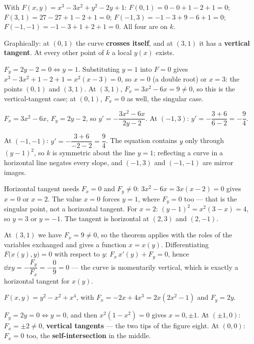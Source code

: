 \begin{solutions}
  \item With $F(x,y)=x^{3}-3x^{2}+y^{2}-2y+1$:
        $F(0,1)=0-0+1-2+1=0$; \;$F(3,1)=27-27+1-2+1=0$;
        \;$F(-1,3)=-1-3+9-6+1=0$; \;$F(-1,-1)=-1-3+1+2+1=0$.
        All four are on $k$.
  \item Graphically: at $(0,1)$ the curve \textbf{crosses itself}, and at
        $(3,1)$ it has a \textbf{vertical tangent}. At every other point of
        $k$ a local $y(x)$ exists.
  \item $F_{y}=2y-2=0\iff y=1$. Substituting $y=1$ into $F=0$ gives
        $x^{3}-3x^{2}+1-2+1=x^{2}(x-3)=0$, so $x=0$ (a double root) or
        $x=3$: the points $(0,1)$ and $(3,1)$. At $(3,1)$,
        $F_{x}=3x^{2}-6x=9\neq0$, so this is the vertical-tangent case; at
        $(0,1)$, $F_{x}=0$ as well, the singular case.
  \item $F_{x}=3x^{2}-6x$, $F_{y}=2y-2$, so
        $y'=-\dfrac{3x^{2}-6x}{2y-2}$. At $(-1,3)$:
        $y'=-\dfrac{3+6}{6-2}=-\dfrac94$.
  \item At $(-1,-1)$: $y'=-\dfrac{3+6}{-2-2}=\dfrac94$. The equation
        contains $y$ only through $(y-1)^{2}$, so $k$ is symmetric about the
        line $y=1$; reflecting a curve in a horizontal line negates every
        slope, and $(-1,3)$ and $(-1,-1)$ are mirror images.
  \item Horizontal tangent needs $F_{x}=0$ and $F_{y}\neq0$:
        $3x^{2}-6x=3x(x-2)=0$ gives $x=0$ or $x=2$. The value $x=0$ forces
        $y=1$, where $F_{y}=0$ too --- that is the singular point, not a
        horizontal tangent. For $x=2$: $(y-1)^{2}=x^{2}(3-x)=4$, so $y=3$ or
        $y=-1$. The tangent is horizontal at $(2,3)$ and $(2,-1)$.
  \item At $(3,1)$ we have $F_{x}=9\neq0$, so the theorem applies with the
        roles of the variables exchanged and gives a function $x=x(y)$.
        Differentiating $F\bigl(x(y),y\bigr)=0$ with respect to $y$:
        $F_{x}\,x'(y)+F_{y}=0$, hence
        $\dd{x}{y}=-\dfrac{F_{y}}{F_{x}}=-\dfrac{0}{9}=0$ --- the curve is
        momentarily vertical, which is exactly a horizontal tangent for
        $x(y)$.
  \item $F(x,y)=y^{2}-x^{2}+x^{4}$, with $F_{x}=-2x+4x^{3}=2x(2x^{2}-1)$
        and $F_{y}=2y$.
  \item $F_{y}=2y=0\iff y=0$, and then $x^{2}(1-x^{2})=0$ gives
        $x=0,\pm1$. At $(\pm1,0)$: $F_{x}=\pm2\neq0$, \textbf{vertical
        tangents} --- the two tips of the figure eight. At $(0,0)$:
        $F_{x}=0$ too, the \textbf{self-intersection} in the middle.

\end{solutions}
